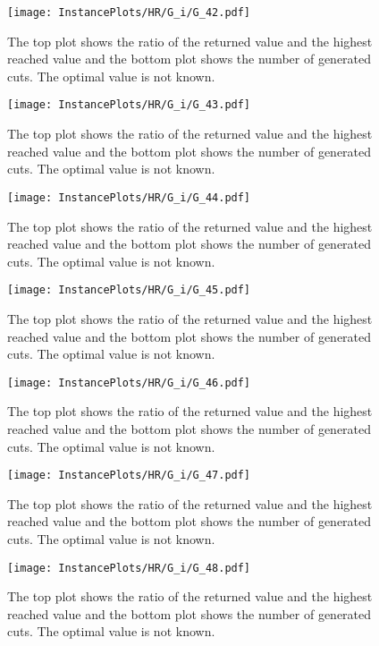 \documentclass[10pt,a4paper]{article}
\begin{document}
\begin{figure}[H]
\texttt{[image: InstancePlots/HR/G\_i/G\_42.pdf]}
\caption{The top plot shows the ratio of the returned value and the highest reached value     and the bottom plot shows the number of generated cuts. The optimal value is not known.}
\end{figure}

\begin{figure}[H]
\texttt{[image: InstancePlots/HR/G\_i/G\_43.pdf]}
\caption{The top plot shows the ratio of the returned value and the highest reached value     and the bottom plot shows the number of generated cuts. The optimal value is not known.}
\end{figure}

\begin{figure}[H]
\texttt{[image: InstancePlots/HR/G\_i/G\_44.pdf]}
\caption{The top plot shows the ratio of the returned value and the highest reached value     and the bottom plot shows the number of generated cuts. The optimal value is not known.}
\end{figure}

\begin{figure}[H]
\texttt{[image: InstancePlots/HR/G\_i/G\_45.pdf]}
\caption{The top plot shows the ratio of the returned value and the highest reached value     and the bottom plot shows the number of generated cuts. The optimal value is not known.}
\end{figure}

\begin{figure}[H]
\texttt{[image: InstancePlots/HR/G\_i/G\_46.pdf]}
\caption{The top plot shows the ratio of the returned value and the highest reached value     and the bottom plot shows the number of generated cuts. The optimal value is not known.}
\end{figure}

\begin{figure}[H]
\texttt{[image: InstancePlots/HR/G\_i/G\_47.pdf]}
\caption{The top plot shows the ratio of the returned value and the highest reached value     and the bottom plot shows the number of generated cuts. The optimal value is not known.}
\end{figure}

\begin{figure}[H]
\texttt{[image: InstancePlots/HR/G\_i/G\_48.pdf]}
\caption{The top plot shows the ratio of the returned value and the highest reached value     and the bottom plot shows the number of generated cuts. The optimal value is not known.}
\end{figure}
\end{document}
